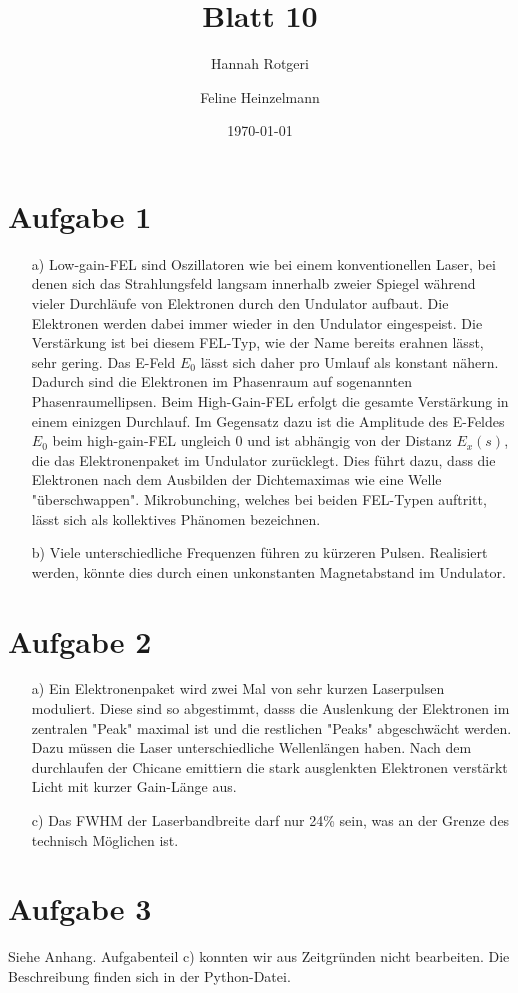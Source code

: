 \documentclass[11pt,a4paper]{article}
\title{Blatt 10}
\date{\today}
\author{Hannah Rotgeri \and Feline Heinzelmann}
\begin{document}
    \maketitle

    \section*{Aufgabe 1}
	\begin{itemize}
		\item[a)] 
			Low-gain-FEL sind Oszillatoren wie bei einem konventionellen Laser, bei denen sich das Strahlungsfeld langsam innerhalb zweier Spiegel während vieler 
			Durchläufe von Elektronen durch den Undulator aufbaut. Die Elektronen werden dabei immer wieder in den Undulator eingespeist. 
			Die Verstärkung ist bei diesem FEL-Typ, wie der Name bereits erahnen lässt, sehr gering. 
            Das E-Feld $E_0$ lässt sich daher pro Umlauf als konstant nähern.
			Dadurch sind die Elektronen im Phasenraum auf sogenannten Phasenraumellipsen.
			Beim High-Gain-FEL erfolgt die gesamte Verstärkung in einem einizgen Durchlauf.
			Im Gegensatz dazu ist die Amplitude des E-Feldes $E_0$ beim high-gain-FEL ungleich 0 und ist abhängig von der Distanz $E_{x}(s)$, die das 
			Elektronenpaket im Undulator zurücklegt.
			Dies führt dazu, dass die Elektronen nach dem Ausbilden der Dichtemaximas wie eine Welle "überschwappen".
			Mikrobunching, welches bei beiden FEL-Typen auftritt, lässt sich als kollektives Phänomen bezeichnen.

		\item[b)]
			Viele unterschiedliche Frequenzen führen zu kürzeren Pulsen. 
			Realisiert werden, könnte dies durch einen unkonstanten Magnetabstand im Undulator.

	\end{itemize}


	
    \section*{Aufgabe 2}
	\begin{itemize}
		\item[a)] 
			Ein Elektronenpaket wird zwei Mal von sehr kurzen Laserpulsen moduliert.
			Diese sind so abgestimmt, dasss die Auslenkung der Elektronen im zentralen "Peak" maximal ist
			und die restlichen "Peaks" abgeschwächt werden.
			Dazu müssen die Laser unterschiedliche Wellenlängen haben.
			Nach dem durchlaufen der Chicane emittiern die stark ausglenkten Elektronen verstärkt Licht mit kurzer Gain-Länge aus.
		\item[c)]
			Das FWHM der Laserbandbreite darf nur 24\% sein, was an der Grenze des technisch Möglichen ist.
	\end{itemize}

	\section*{Aufgabe 3}

        Siehe Anhang. Aufgabenteil c) konnten wir aus Zeitgründen nicht bearbeiten. Die Beschreibung finden sich in der Python-Datei.
\end{document}
